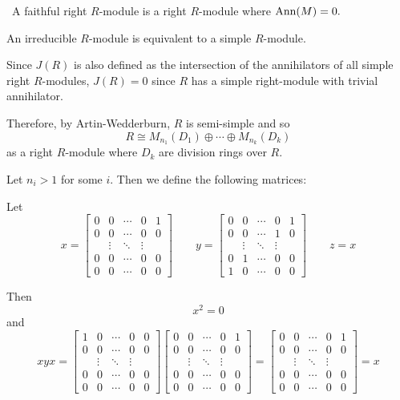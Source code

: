 \documentclass[12pt]{Qual}
\begin{document}
\begin{solution}$\,$
A faithful right $R$-module is a right $R$-module where $\text{Ann}(M)=0.$

An irreducible $R$-module is equivalent to a simple $R$-module.

Since $J(R)$ is also defined as the intersection of the annihilators of all simple right $R$-modules, $J(R)=0$ since $R$ has a simple right-module with trivial annihilator.

Therefore, by Artin-Wedderburn, $R$ is semi-simple and so $$R\cong M_{n_1}(D_1)\oplus\cdots\oplus M_{n_k}(D_k)$$ as a right $R$-module where $D_k$ are division rings over $R.$

Let $n_i>1$ for some $i$. Then we define the following matrices:

Let $$x=\begin{bmatrix}
    0 & 0 & \cdots & 0 & 1\\
    0 & 0 & \cdots & 0 & 0\\
    & \vdots & \ddots & \vdots &\\
    0 & 0 & \cdots & 0 & 0\\
    0 & 0 & \cdots & 0 & 0
    \end{bmatrix} \qquad y=\begin{bmatrix}
    0 & 0 & \cdots & 0 & 1\\
    0 & 0 & \cdots & 1 & 0\\
    & \vdots & \ddots & \vdots &\\
    0 & 1 & \cdots & 0 & 0\\
    1 & 0 & \cdots & 0 & 0
    \end{bmatrix}\qquad z=x $$

    Then $$x^2=0$$ and $$xyx=\begin{bmatrix}
    1 & 0 & \cdots & 0 & 0\\
    0 & 0 & \cdots & 0 & 0\\
    & \vdots & \ddots & \vdots &\\
    0 & 0 & \cdots & 0 & 0\\
    0 & 0 & \cdots & 0 & 0
    \end{bmatrix}\begin{bmatrix}
    0 & 0 & \cdots & 0 & 1\\
    0 & 0 & \cdots & 0 & 0\\
    & \vdots & \ddots & \vdots &\\
    0 & 0 & \cdots & 0 & 0\\
    0 & 0 & \cdots & 0 & 0
    \end{bmatrix}=\begin{bmatrix}
    0 & 0 & \cdots & 0 & 1\\
    0 & 0 & \cdots & 0 & 0\\
    & \vdots & \ddots & \vdots &\\
    0 & 0 & \cdots & 0 & 0\\
    0 & 0 & \cdots & 0 & 0
    \end{bmatrix}=x$$


\end{solution}
\end{document}
